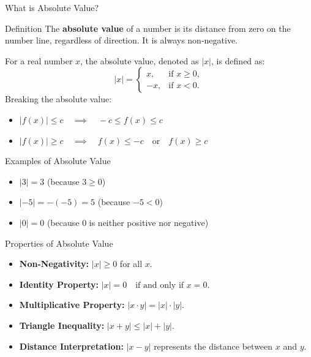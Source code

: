 \documentclass{beamer}
\begin{document}
\begin{frame}{What is Absolute Value?}
  \begin{block}{Definition}
      The \textbf{absolute value} of a number is its distance from zero on the number line, regardless of direction. It is always non-negative.
  \end{block}

  \vspace{10pt}

  For a real number \(x\), the absolute value, denoted as \(|x|\), is defined as:
  \[
  |x| =
  \begin{cases} 
  x, & \text{if } x \geq 0, \\
  -x, & \text{if } x < 0.
  \end{cases}
  \]
Breaking the absolute value: 
  \begin{itemize}
    \item \( |f(x)| \leq c \quad \implies \quad -c \leq f(x) \leq c \)
    \item \( |f(x)| \geq c \quad \implies \quad f(x) \leq -c \quad \text{or} \quad f(x) \geq c \)
\end{itemize}

\end{frame}

\begin{frame}{Examples of Absolute Value}
  \begin{itemize}
      \item \(|3| = 3\) \quad (because \(3 \geq 0\))
      \item \(|-5| = -(-5) = 5\) \quad (because \(-5 < 0\))
      \item \(|0| = 0\) \quad (because \(0\) is neither positive nor negative)
  \end{itemize}
\end{frame}

\begin{frame}{Properties of Absolute Value}
  \begin{itemize}
      \item \textbf{Non-Negativity:} \(|x| \geq 0\) for all \(x\).
      \item \textbf{Identity Property:} \(|x| = 0 \quad \text{if and only if } x = 0.\)
      \item \textbf{Multiplicative Property:} \(|x \cdot y| = |x| \cdot |y|\).
      \item \textbf{Triangle Inequality:} \(|x + y| \leq |x| + |y|\).
      \item \textbf{Distance Interpretation:} \(|x - y|\) represents the distance between \(x\) and \(y\).
  \end{itemize}
\end{frame}
\end{document}
